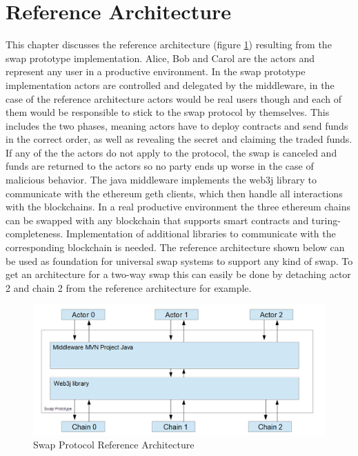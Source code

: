 \clearpage


\section{Reference Architecture}
\label{sec:chapter04:ref_architecture}

This chapter discusses the reference architecture (figure \ref{fig:reference_architecture}) resulting from the swap prototype implementation. Alice, Bob and Carol are the actors and represent any user in a productive environment. In the swap prototype implementation actors are controlled and delegated by the middleware, in the case of the reference architecture actors would be real users though and each of them would be responsible to stick to the swap protocol by themselves. This includes the two phases, meaning actors have to deploy contracts and send funds in the correct order, as well as revealing the secret and claiming the traded funds. If any of the the actors do not apply to the protocol, the swap is canceled and funds are returned to the actors so no party ends up worse in the case of malicious behavior. The java middleware implements the web3j library to communicate with the ethereum geth clients, which then handle all interactions with the blockchains. In a real productive environment the three ethereum chains can be swapped with any blockchain that supports smart contracts and turing-completeness. Implementation of additional libraries to communicate with the corresponding blockchain is needed. The reference architecture shown below can be used as foundation for universal swap systems to support any kind of swap. To get an architecture for a two-way swap this can easily be done by detaching actor 2 and chain 2 from the reference architecture for example. \newline \newline


\begin{figure}[h]
	\includegraphics[width=0.7\paperwidth]{reference_architecture}
	\caption{Swap Protocol Reference Architecture}
	\label{fig:reference_architecture}
\end{figure}
\clearpage

